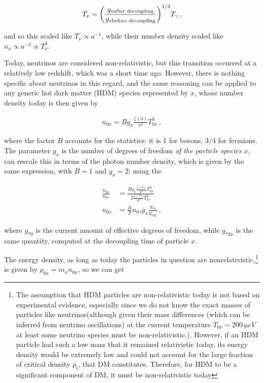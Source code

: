 \begin{align}
    T_{\nu } = \qty(\frac{g_{* \text{after decoupling}}}{g_{* \text{before decoupling}}})^{1/3} T_{\gamma }\,,
\end{align}

and so this scaled like \(T_\nu \propto a^{-1}\), while their number density scaled like \(n_\nu \propto a^{-3} \propto T_\nu^{3}\).

\hspace{0.5cm}Today, neutrinos are considered non-relativistic, but this transition occurred at a relatively low redshift, which was a short time ago. However, there is nothing specific about neutrinos in this regard, and the same reasoning can be applied to any generic hot dark matter (HDM) species represented by \(x\), whose number density today is then given by

\begin{align}
  n_{0x} = B g_{x} \frac{\zeta (3)}{\pi^2} T_{0x}^3
\,,
\end{align}

where the factor \(B\) accounts for the statistics: it is 1 for bosons, \(3/4\) for fermions. The parameter \(g_x\) is the number of degrees of freedom \emph{of the particle species \(x\)}, 
 can rescale this in terms of the photon number density, which is given by the same expression, with \(B = 1\) and \(g_x = 2\): using the 

\begin{align}
\frac{n_{0x}}{n_{0\gamma }} &= \frac{B g_x \frac{\zeta (3)}{\pi^2} T^3_{0x}}{2 \frac{\zeta (3)}{\pi^2} T^3_{0 \gamma }} \\
n_{0x} &= \frac{B}{2} n_{0 \gamma } g_x \frac{g_{*0}}{g_{*dx}}
\,,
\end{align}

where \(g_{*0}\) is the current amount of effective degrees of freedom, while \(g_{*dx}\) is the same quantity, computed at the decoupling time of particle \(x\). 



The energy density, as long as today the particles in question are nonrelativistic,\footnote{
The assumption that HDM particles are non-relativistic today is not based on experimental evidence, especially since we do not know the exact masses of particles like neutrinos(although given their mass differences (which can be inferred from neutrino oscillations) at the current temperature \(T_{0 \nu } \sim \SI{200}{\micro eV}\) at least some neutrino species must be non-relativistic.). However, if an HDM particle had such a low mass that it remained relativistic today, its energy density would be extremely low and could not account for the large fraction of critical density \(\rho _C\)  that DM constitutes. Therefore, for HDM to be a significant component of DM, it must be non-relativistic today} is given by \(\rho_{0x} = m_x n_{0x}\), so we can get

